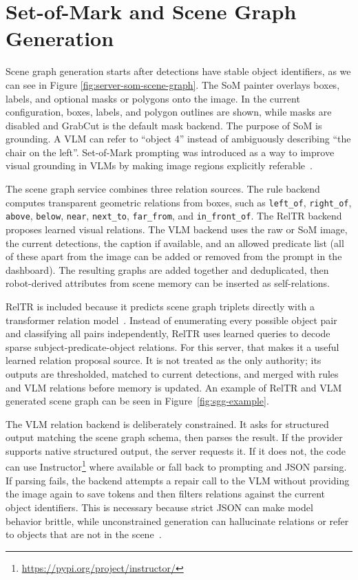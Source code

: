 \section{Set-of-Mark and Scene Graph Generation}\label{sec:server-scene-graph-generation}

Scene graph generation starts after detections have stable object identifiers, as we can see in Figure \ref{fig:server-som-scene-graph}. The SoM painter overlays boxes, labels, and optional masks or polygons onto the image. In the current configuration, boxes, labels, and polygon outlines are shown, while masks are disabled and GrabCut is the default mask backend. The purpose of SoM is grounding. A VLM can refer to \enquote{object 4} instead of ambiguously describing \enquote{the chair on the left}. Set-of-Mark prompting was introduced as a way to improve visual grounding in VLMs by making image regions explicitly referable~\cite{yang_set-of-mark_2023}.

The scene graph service combines three relation sources. The rule backend computes transparent geometric relations from boxes, such as \texttt{left\_of}, \texttt{right\_of}, \texttt{above}, \texttt{below}, \texttt{near}, \texttt{next\_to}, \texttt{far\_from}, and \texttt{in\_front\_of}. The RelTR backend proposes learned visual relations. The VLM backend uses the raw or SoM image, the current detections, the caption if available, and an allowed predicate list (all of these apart from the image can be added or removed from the prompt in the dashboard). The resulting graphs are added together and deduplicated, then robot-derived attributes from scene memory can be inserted as self-relations.

RelTR is included because it predicts scene graph triplets directly with a transformer relation model~\cite{cong_reltr_2023}. Instead of enumerating every possible object pair and classifying all pairs independently, RelTR uses learned queries to decode sparse subject-predicate-object relations. For this server, that makes it a useful learned relation proposal source. It is not treated as the only authority; its outputs are thresholded, matched to current detections, and merged with rules and VLM relations before memory is updated. An example of RelTR and VLM generated scene graph can be seen in Figure~\ref{fig:sgg-example}.

The VLM relation backend is deliberately constrained. It asks for structured output matching the scene graph schema, then parses the result. If the provider supports native structured output, the server requests it. If it does not, the code can use Instructor\footnote{\url{https://pypi.org/project/instructor/}} where available or fall back to prompting and JSON parsing. If parsing fails, the backend attempts a repair call to the VLM without providing the image again to save tokens and then filters relations against the current object identifiers. This is necessary because strict JSON can make model behavior brittle, while unconstrained generation can hallucinate relations or refer to objects that are not in the scene~\cite{tam_let_2024}.

